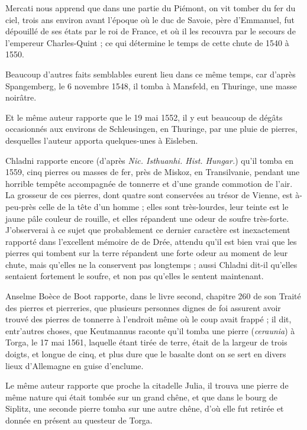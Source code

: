 \documentclass[a4paper, 12pt, oneside, french]{article}
\begin{document}
Mercati nous apprend que dans une partie du Piémont, on vit tomber du fer du ciel, trois ans environ avant l'époque où le duc de Savoie, père d'Emmanuel, fut dépouillé de ses états par le roi de France, et où il les recouvra par le secours de l'empereur Charles-Quint ; ce qui détermine le temps de cette chute de 1540 à 1550.

Beaucoup d'autres faits semblables eurent lieu dans ce même temps, car d'après Spangemberg, le 6 novembre 1548, il tomba à Mansfeld, en Thuringe, une masse noirâtre.

Et le même auteur rapporte que le 19 mai 1552, il y eut beaucoup de dégâts occasionnés aux environs de Schleusingen, en Thuringe, par une pluie de pierres, desquelles l'auteur apporta quelques-unes à Eisleben.

Chladni rapporte encore (d'après \emph{Nic. Isthuanhi. Hist. Hungar.}) qu'il tomba en 1559, cinq pierres ou masses de fer, près de Miskoz, en Transilvanie, pendant une horrible tempête accompagnée de tonnerre et d'une grande commotion de l'air. La grosseur de ces pierres, dont quatre sont conservées au trésor de Vienne, est à-peu-près celle de la tête d'un homme ; elles sont très-lourdes, leur teinte est le jaune pâle couleur de rouille, et elles répandent une odeur de soufre très-forte. J'observerai à ce sujet que probablement ce dernier caractère est inexactement rapporté dans l'excellent mémoire de de Drée, attendu qu'il est bien vrai que les pierres qui tombent sur la terre répandent une forte odeur au moment de leur chute, mais qu'elles ne la conservent pas longtemps ; aussi Chladni dit-il qu'elles sentaient fortement le soufre, et non pas qu'elles le sentent maintenant.

Anselme Boèce de Boot rapporte, dans le livre second, chapitre 260 de son Traité des pierres et pierreries, que plusieurs personnes dignes de foi assurent avoir trouvé des pierres de tonnerre à l'endroit même où le coup avait frappé ; il dit, entr'autres choses, que Keutmannus raconte qu'il tomba une pierre (\emph{ceraunia}) à Torga, le 17 mai 1561, laquelle étant tirée de terre, était de la largeur de trois doigts, et longue de cinq, et plus dure que le basalte dont on se sert en divers lieux d'Allemagne en guise d'enclume.

Le même auteur rapporte que proche la citadelle Julia, il trouva une pierre de même nature qui était tombée sur un grand chêne, et que dans le bourg de Siplitz, une seconde pierre tomba sur une autre chêne, d'où elle fut retirée et donnée en présent au questeur de Torga.
\end{document}
